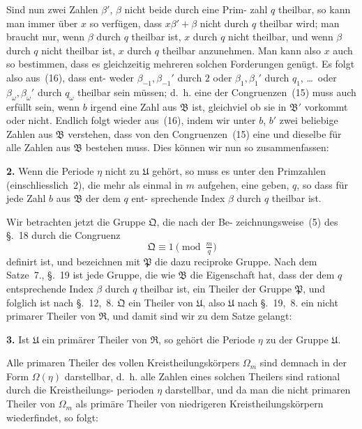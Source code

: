 \documentclass[12pt,a4paper]{article}
\theoremstyle{plain}
\theoremstyle{definition}
\theoremstyle{remark}
\begin{document}
Sind nun zwei Zahlen $\beta'$, $\beta$ nicht beide durch eine Prim-
zahl $q$ theilbar, so kann man immer über $x$ so verfügen, dass
$x\beta' + \beta$ nicht durch $q$ theilbar wird; man braucht nur, wenn $\beta$
durch $q$ theilbar ist, $x$ durch $q$ nicht theilbar, und wenn $\beta$
durch $q$ nicht theilbar ist, $x$ durch $q$ theilbar anzunehmen. Man
kann also $x$ auch so bestimmen, dass es gleichzeitig mehreren
solchen Forderungen genügt. Es folgt also aus~(16), dass ent-
weder $\beta_{-1}, \beta_{-1}'$ durch $2$ oder $\beta_1, \beta_1'$ durch $q_1$, \ldots\ oder $\beta_\omega, \beta_\omega'$
durch $q_\omega$ theilbar sein müssen; d.~h. eine der Congruenzen~(15) muss
auch erfüllt sein, wenn $b$ irgend eine Zahl aus $\mathfrak{B}$ ist, gleichviel
ob sie in $\mathfrak{B}'$ vorkommt oder nicht. Endlich folgt wieder aus~(16),
indem wir unter $b$, $b'$ zwei beliebige Zahlen aus $\mathfrak{B}$ verstehen,
dass von den Congruenzen~(15) eine und dieselbe für alle Zahlen
aus $\mathfrak{B}$ bestehen muss. Dies können wir nun so zusammenfassen:

\textbf{2.} Wenn die Periode $\eta$ nicht zu $\mathfrak{U}$ gehört, so muss
es unter den Primzahlen (einschliesslich~$2$), die
mehr als einmal in $m$ aufgehen, eine geben, $q$,
so dass für jede Zahl $b$ aus $\mathfrak{B}$ der dem $q$ ent-
sprechende Index $\beta$ durch $q$ theilbar ist.

Wir betrachten jetzt die Gruppe $\mathfrak{Q}$, die nach der Be-
zeichnungsweise~(5) des \S.~18 durch die Congruenz
\begin{equation}\tag{17}
\mathfrak{Q} \equiv 1 \pmod{\tfrac{m}{q}}
\end{equation}
definirt ist, und bezeichnen mit $\mathfrak{P}$ die dazu reciproke Gruppe.
Nach dem Satze~7., \S.~19 ist jede Gruppe, die wie $\mathfrak{B}$ die
Eigenschaft hat, dass der dem $q$ entsprechende Index $\beta$ durch $q$
theilbar ist, ein Theiler der Gruppe $\mathfrak{P}$, und folglich ist nach
\S.~12,~8. $\mathfrak{Q}$ ein Theiler von $\mathfrak{U}$, also $\mathfrak{U}$ nach \S.~19,~8. ein nicht
primarer Theiler von $\mathfrak{R}$, und damit sind wir zu dem Satze
gelangt:

\textbf{3.} Ist $\mathfrak{U}$ ein primärer Theiler von $\mathfrak{R}$, so gehört die
Periode $\eta$ zu der Gruppe $\mathfrak{U}$.

Alle primaren Theiler des vollen Kreistheilungskörpers $\Omega_m$
sind demnach in der Form $\Omega(\eta)$ darstellbar, d.~h. alle Zahlen
eines solchen Theilers sind rational durch die Kreistheilungs-
perioden $\eta$ darstellbar, und da man die nicht primaren Theiler
von $\Omega_m$ als primäre Theiler von niedrigeren Kreistheilungskörpern
wiederfindet, so folgt:
\end{document}
